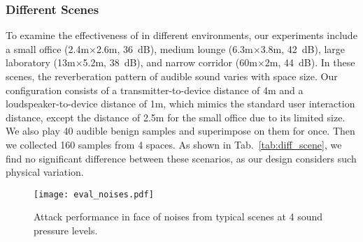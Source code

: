 

\subsubsection{Different Scenes}
To examine the effectiveness of \alias in different environments, our experiments include a small office (2.4m$\times$2.6m, 36~dB), medium lounge (6.3m$\times$3.8m, 42~dB), large laboratory (13m$\times$5.2m, 38~dB), and narrow corridor (60m$\times$2m, 44~dB). In these scenes, the reverberation pattern of audible sound varies with space size.
Our configuration consists of a transmitter-to-device distance of 4m and a loudspeaker-to-device distance of 1m, which mimics the standard user interaction distance, except the distance of 2.5m for the small office due to its limited size. 
We also play 40 audible benign samples and superimpose \alias on them for once. Then we collected 160 samples from 4 spaces. As shown in Tab.~\ref{tab:diff_scene}, we find no significant difference between these scenarios, as our design considers such physical variation.

\begin{figure}[t]
    \centering
    \texttt{[image: eval\_noises.pdf]}
    \caption{Attack performance in face of noises from typical scenes at 4 sound pressure levels.}
    \label{fig:eval_noises}
    \vspace{-10pt}
\end{figure}

